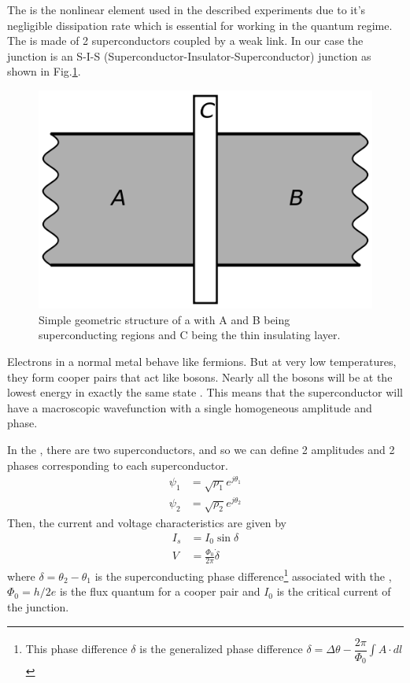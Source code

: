 The \JJ is the nonlinear element used in the described experiments due to it's negligible dissipation rate which is essential for working in the quantum regime.\\
The \JJ is made of 2 superconductors coupled by a weak link. In our case the junction is an S-I-S (Superconductor-Insulator-Superconductor) junction as shown in Fig.\ref{fig:SISJJ}.

\begin{figure}
\centering
\includegraphics[width=\linewidth]{Figures/SISJJ}
\decoRule
\caption[Josephson Junction]{Simple geometric structure of a \JJ with A and B being superconducting regions and C being the thin insulating layer.}
\label{fig:SISJJ}
\end{figure}

Electrons in a normal metal behave like fermions. But at very low temperatures, they form cooper pairs that act like bosons. Nearly all the bosons will be at the lowest energy in exactly the same state \cite{Feynman1966}. This means that the superconductor will have a macroscopic wavefunction with a single homogeneous amplitude and phase.

In the \JJ, there are two superconductors, and so we can define 2 amplitudes and 2 phases corresponding to each superconductor.
\begin{align*}
\psi_1&=\sqrt{\rho_1}e^{j\theta_1}\\
\psi_2&=\sqrt{\rho_2}e^{j\theta_2}
\end{align*}
Then, the current and voltage characteristics are given by \cite{Harmans1997}
\begin{align}
I_s&=I_0\sin\delta
\label{eqn:JJ current}\\
V&=\frac{\Phi_0}{2\pi}\dot{\delta}
\label{eqn:JJ voltage}
\end{align}
where $\delta=\theta_2-\theta_1$ is the superconducting phase difference\footnote{This phase difference $\delta$ is the generalized phase difference $\delta=\Delta\theta-\displaystyle\dfrac{2\pi}{\Phi_0}\int A\cdot dl$} associated with the \JJ, $\Phi_0=h/2e$ is the flux quantum for a cooper pair and $I_0$ is the critical current of the junction.

